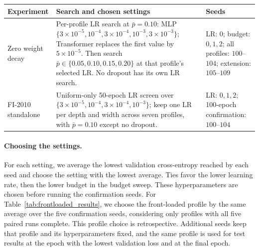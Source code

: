 \par\medskip
\noindent\begin{minipage}{\textwidth}
\begingroup
\centering
{}
\label{tab:benchmark_search}
\small
\setlength{\tabcolsep}{4pt}
\renewcommand{\arraystretch}{1.2}
\begin{tabular}{@{}p{}p{}p{}@{}}
\toprule
Experiment & Search and chosen settings & Seeds \\
\midrule
Zero weight decay & Per-profile LR search at $\bar p=0.10$: MLP $\{3\!\times\!10^{-5},10^{-4},3\!\times\!10^{-4},10^{-3},3\!\times\!10^{-3}\}$; Transformer replaces the first value by $5\!\times\!10^{-5}$. Then search $\bar p\in\{0.05,0.10,0.15,0.20\}$ at that profile's selected LR. No dropout has its own LR search. & LR: $0$; budget: $0,1,2$; all profiles: $100$--$104$; extension: $105$--$109$ \\
FI-2010 standalone & Uniform-only 50-epoch LR screen over $\{3\!\times\!10^{-5},10^{-4},3\!\times\!10^{-4},10^{-3}\}$; keep one LR per depth and width across seven profiles, with $\bar p=0.10$ except no dropout. & LR: $0,1,2$; 100-epoch confirmation: $100$--$104$ \\
\bottomrule
\end{tabular}
\par
\endgroup

\paragraph{Choosing the settings.}
For each setting, we average the lowest validation cross-entropy reached by each seed and choose the setting with the lowest average. Ties favor the lower learning rate, then the lower budget in the budget sweep. These hyperparameters are chosen before running the confirmation seeds. For Table~\ref{tab:frontloaded_results}, we choose the front-loaded profile by the same average over the five confirmation seeds, considering only profiles with all five paired runs complete. This profile choice is retrospective. Additional seeds keep that profile and its hyperparameters fixed, and the same profile is used for test results at the epoch with the lowest validation loss and at the final epoch.


\end{minipage}
